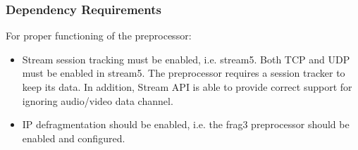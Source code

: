 \documentclass[english]{report}
\begin{document}
\subsubsection{Dependency Requirements}

For proper functioning of the preprocessor:

\begin{itemize}

\item Stream session tracking must be enabled, i.e. stream5. Both TCP and UDP must be
      enabled in stream5. The preprocessor requires a session tracker to keep its 
      data. In addition, Stream API is able to provide correct support for ignoring 
      audio/video data channel.

\item  IP defragmentation should be enabled, i.e. the frag3 preprocessor should be
      enabled and configured.

\end{itemize}
\end{document}
